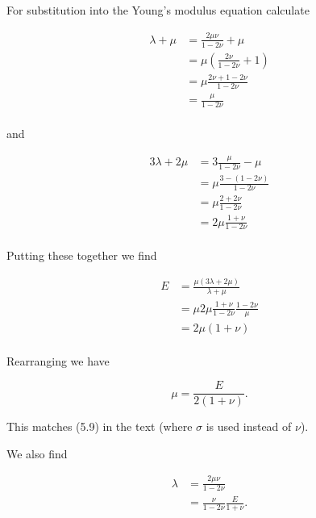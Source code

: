 For substitution into the Young's modulus equation calculate

\begin{align*}
\lambda + \mu 
&= \frac{ 2 \mu \nu} { 1 - 2 \nu } + \mu \\
&= \mu \left( \frac{ 2 \nu} { 1 - 2 \nu } + 1 \right)  \\
&= \mu \frac{ 2 \nu + 1 - 2 \nu} { 1 - 2 \nu }  \\
&= \frac{ \mu} { 1 - 2 \nu }  \\
\end{align*}

and 

\begin{align*}
3 \lambda + 2 \mu 
&= 3 \frac{ \mu} { 1 - 2 \nu } - \mu \\
&= \mu \frac{ 3 - (1 - 2 \nu)} { 1 - 2 \nu } \\
&= \mu \frac{ 2 + 2 \nu} { 1 - 2 \nu } \\
&= 2 \mu \frac{ 1 + \nu} { 1 - 2 \nu } \\
\end{align*}

Putting these together we find

\begin{align*}
E 
&= \frac{\mu(3 \lambda + 2 \mu)}{\lambda + \mu } \\
&= \mu 2 \mu \frac{ 1 + \nu} { 1 - 2 \nu } \frac{ 1 - 2 \nu}{\mu} \\
&= 2 \mu ( 1 + \nu ) \\
\end{align*}

Rearranging we have

\begin{equation}\label{eqn:continuumL6:530}
\mu = \frac{E}{2 (1 + \nu)}.
\end{equation}

This matches (5.9) in the text (where $\sigma$ is used instead of $\nu$).

We also find

\begin{align*}
\lambda 
&= \frac{ 2 \mu \nu} { 1 - 2 \nu } \\
&= \frac{ \nu} { 1 - 2 \nu } \frac{E }{1 + \nu}.
\end{align*}


\EndArticle
